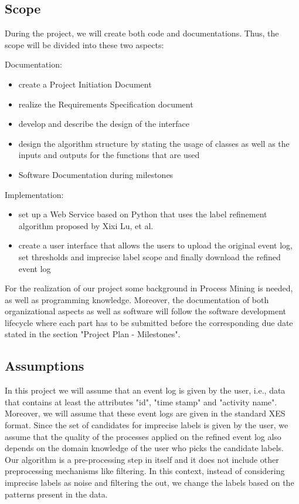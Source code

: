 \documentclass[notitlepage]{article}
\begin{document}
\begin{flushleft}
\subsection{Scope}

During the project, we will create both code and documentations. Thus, the scope will be divided into these two aspects:

Documentation: 
\begin{itemize}
	\item create a Project Initiation Document 
	\item realize the Requirements Specification document
	\item develop and describe the design of the interface 
	\item design the algorithm structure by stating the usage of classes as well as the inputs and outputs for the functions that are used
	\item Software Documentation during milestones
\end{itemize} 


Implementation:
\begin{itemize}
	\item set up a Web Service based on Python that uses the label refinement algorithm proposed by Xixi Lu, et al.
	\item create a user interface that allows the users to upload the original event log, set thresholds and imprecise label scope and finally download the refined event log
\end{itemize}

For the realization of our project some background in Process Mining is needed, as well as programming knowledge.
Moreover, the documentation of both organizational aspects as well as software will follow the software development lifecycle where each part has to be submitted before the corresponding due date stated in the section "Project Plan - Milestones".


\subsection{Assumptions}

In this project we will assume that an event log is given by the user, i.e., data that contains at least the attributes "id", "time stamp" and "activity name". Moreover, we will assume that these event logs are given in the standard XES format.
Since the set of candidates for imprecise labels is given by the user, we assume that the quality of the processes applied on the refined event log also depends on the domain knowledge of the user who picks the candidate labels.
Our algorithm is a pre-processing step in itself and it does not include other preprocessing mechanisms like filtering.
In this context, instead of considering imprecise labels as noise and filtering the out, we change the labels based on the patterns present in the data.




\end{flushleft}
\end{document}
